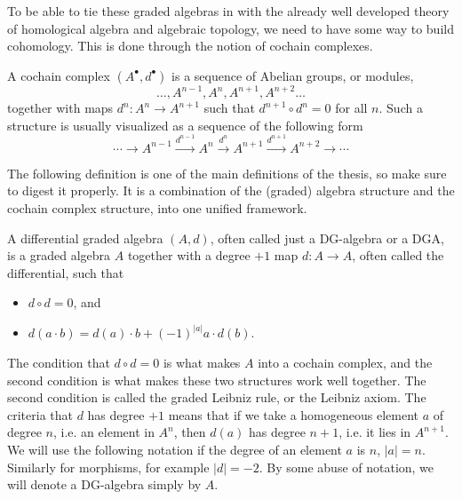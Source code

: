 To be able to tie these graded algebras in with the already well developed theory of homological algebra and algebraic topology, we need to have some way to build cohomology. This is done through the notion of cochain complexes. 

\begin{definition}
\label{def:cochain_complex}
A cochain complex $(A^{\bullet}, d^{\bullet})$ is a sequence of Abelian groups, or modules,
\begin{equation*}
    \ldots, A^{n-1}, A^n, A^{n+1}, A^{n+2}\ldots
\end{equation*}
together with maps $d^n:A^n\rightarrow A^{n+1}$ such that $d^{n+1}\circ d^n = 0$ for all $n$. Such a structure is usually visualized as a sequence of the following form
\begin{equation*}
    \cdots\longrightarrow A^{n-1} \overset{d^{n-1}}\longrightarrow A^n \overset{d^n}\longrightarrow A^{n+1} \overset{d^{n+1}}\longrightarrow A^{n+2}\longrightarrow\cdots
\end{equation*}
\end{definition}

The following definition is one of the main definitions of the thesis, so make sure to digest it properly. It is a combination of the (graded) algebra structure and the cochain complex structure, into one unified framework. 

\begin{definition}[DG-algebra]
\label{def:dga}
A differential graded algebra $(A, d)$, often called just a DG-algebra or a DGA, is a graded algebra $A$ together with a degree $+1$ map $d: A\rightarrow A$, often called the differential, such that 
\begin{itemize}
    \item $d\circ d = 0$, and
    \item $d(a\cdot b) = d(a)\cdot b + (-1)^{|a|}a\cdot d(b)$. 
\end{itemize}
\end{definition}

The condition that $d\circ d = 0$ is what makes $A$ into a cochain complex, and the second condition is what makes these two structures work well together. The second condition is called the graded Leibniz rule, or the Leibniz axiom. The criteria that $d$ has degree $+1$ means that if we take a homogeneous element $a$ of degree $n$, i.e. an element in $A^n$, then $d(a)$ has degree $n+1$, i.e. it lies in $A^{n+1}$. We will use the following notation if the degree of an element $a$ is $n$, $|a|=n$. Similarly for morphisms, for example $|d|=-2$. By some abuse of notation, we will denote a DG-algebra simply by $A$.

